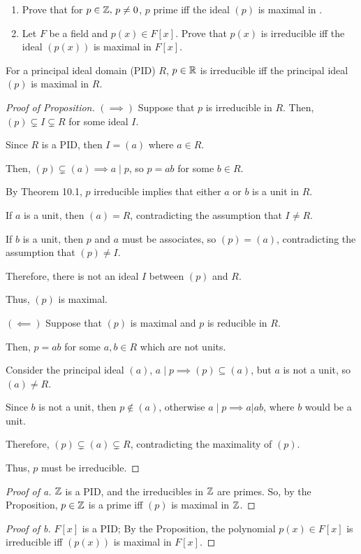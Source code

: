 \documentclass[../hw8]{subfiles}
\begin{document}
\begin{problem}
\begin{enumerate}[label=\alph*)]
	\item Prove that for $p \in \mathbb{Z},\, p\neq 0$, $p$ prime iff the ideal $(p)$ is maximal in  \Z.
	\item Let $F$ be a field and $p(x)\in F[x]$.
	      Prove that $p(x)$ is irreducible iff the ideal  $(p(x))$ is maximal in  $F[x]$.
\end{enumerate}
\end{problem}
\begin{proposition}
	For a principal ideal domain (PID) $R$,  $p \in \mathbb{R} $ is irreducible iff the principal ideal $(p)$ is maximal in $R$.
\end{proposition}
\begin{proof}[Proof of Proposition]
	$(\implies)$ Suppose that $p$ is irreducible in  $R$.
	Then,  $(p)\subsetneq I\subsetneq R$ for some ideal $I$.

	Since $R$ is a PID, then $I=(a)$ where $a\in R$.

	Then, $(p)\subsetneq (a)\implies a\mid p$, so $p = ab$ for some $b \in R$.

	By Theorem 10.1, $p$ irreducible implies that  either $a$ or  $b$ is  a unit in  $R$.

	If $a$ is a unit, then  $(a)=R$, contradicting the assumption that  $I\neq R$.

	If $b$ is a unit, then  $p$ and  $a$ must be associates, so $(p)=(a)$, contradicting the assumption that  $(p)\neq I$.

	Therefore, there is not an ideal $I$ between  $(p)$ and $R$.

	Thus,  $(p)$ is maximal.

	$(\impliedby)$ Suppose that $(p)$ is maximal and  $p$ is reducible in  $R$.

	Then, $p=ab$ for some  $a,b\in R$ which are not units.

	Consider the principal ideal $(a)$, $a \mid p \implies (p)\subseteq (a)$,
	but $a$ is not a unit,
	so  $(a)\neq R$.

	Since $b$ is not a unit, then  $p \not\in (a)$,
	otherwise $a\mid p \implies a | ab$, where $b$ would be a unit.

	Therefore, $(p)\subsetneq (a)\subsetneq R$, contradicting the maximality of $(p)$.

	Thus, $p$ must be irreducible.
\end{proof}
\begin{proof}[Proof of a]
	$\mathbb{Z}$ is a PID, and the irreducibles in $\mathbb{Z}$ are primes.
	So, by the Proposition, $p \in \mathbb{Z} $ is a prime iff $(p)$ is maximal in  $\mathbb{Z}$.
\end{proof}
\begin{proof}[Proof of b]
	$F[x]$ is a PID;
	By the Proposition, the polynomial $p(x)\in F[x]$ is irreducible iff $(p(x))$ is maximal in  $F[x]$.
\end{proof}
\end{document}
